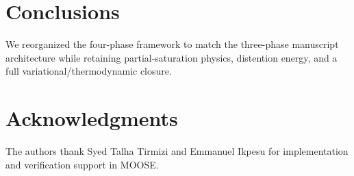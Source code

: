 \documentclass[11pt]{article}
\begin{document}
\section{Conclusions}
\label{sec:conclusions}

We reorganized the four-phase framework to match the three-phase manuscript architecture while retaining partial-saturation physics, distention energy, and a full variational/thermodynamic closure.

\section*{Acknowledgments}
The authors thank Syed Talha Tirmizi and Emmanuel Ikpesu for implementation and verification support in MOOSE.

\appendix


%



\end{document}
